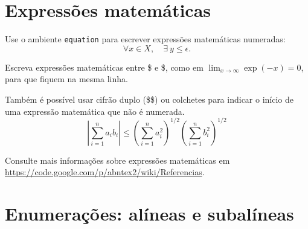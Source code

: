 \documentclass[article,12pt,oneside,a4paper,chapter=TITLE,english,brazil]{abntex2}
\begin{document}
\begin{anexosenv}
\section{Expressões matemáticas}

Use o ambiente \texttt{equation} para escrever expressões matemáticas numeradas:
\begin{equation}
  \forall x \in X, \quad \exists \: y \leq \epsilon.
\end{equation}

Escreva expressões matemáticas entre \$ e \$, como em $ \lim_{x \to \infty} \exp(-x) = 0 $, para que fiquem na mesma linha.

Também é possível usar cifrão duplo (\$\$) ou colchetes para indicar o início de uma expressão matemática que não é numerada.
$$
\left|\sum_{i=1}^n a_ib_i\right|
\le
\left(\sum_{i=1}^n a_i^2\right)^{1/2}
\left(\sum_{i=1}^n b_i^2\right)^{1/2}
$$

Consulte mais informações sobre expressões matemáticas em \url{https://code.google.com/p/abntex2/wiki/Referencias}.


\section{Enumerações: alíneas e subalíneas}


\end{anexosenv}
\end{document}
